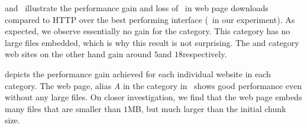 
 and~ illustrate the performance gain and
loss of \mhttp~in web page downloads compared to HTTP over the best performing
interface (\ethernet~in our experiment).
As expected, we observe essentially no gain for the  category. 
This category has no large files embedded, which is why this result is not surprising. 
The  and  category web sites on the other hand gain around $5$\perc and $18$\perc respectively. 


 depicts the performance gain achieved for each individual 
website in each category. The web page, alias \emph{A} in the 
category in~ shows good performance even without
any large files. On closer investigation, we find that the web
page embeds many files that are smaller than $1$MB, but much larger than the
initial chunk size. 

